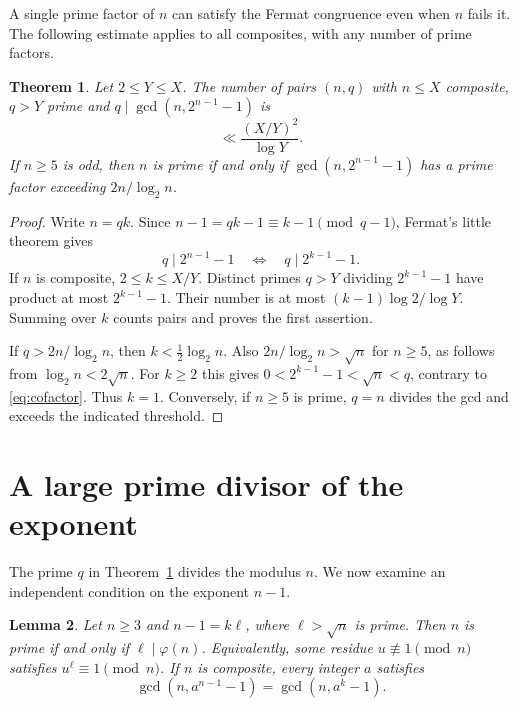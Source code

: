 \documentclass[11pt]{article}
\newtheorem{theorem}{Theorem}[section]
\newtheorem{lemma}[theorem]{Lemma}
\begin{document}
A single prime factor of \(n\) can satisfy the Fermat congruence
even when \(n\) fails it. The following estimate applies to all
composites, with any number of prime factors.

\begin{theorem}\label{thm:common}
Let \(2\le Y\le X\). The number of pairs \((n,q)\) with
\(n\le X\) composite, \(q>Y\) prime and
\(q\mid\gcd(n,2^{n-1}-1)\) is
\[
                        \ll \frac{(X/Y)^2}{\log Y}.
\]
If \(n\ge5\) is odd, then \(n\) is prime if and only if
\(\gcd(n,2^{n-1}-1)\) has a prime factor exceeding
\(2n/\log_2 n\).
\end{theorem}

\begin{proof}
Write \(n=qk\). Since \(n-1=qk-1\equiv k-1\pmod{q-1}\),
Fermat's little theorem gives
\begin{equation}\label{eq:cofactor}
             q\mid 2^{n-1}-1\quad\Longleftrightarrow\quad
             q\mid 2^{k-1}-1.
\end{equation}
If \(n\) is composite, \(2\le k\le X/Y\). Distinct primes
\(q>Y\) dividing \(2^{k-1}-1\) have product at most \(2^{k-1}-1\).
Their number is at most \((k-1)\log 2/\log Y\). Summing over
\(k\) counts pairs and proves the first assertion.

If \(q>2n/\log_2 n\), then \(k<\tfrac12\log_2 n\).
Also \(2n/\log_2 n>\sqrt n\) for \(n\ge5\), as follows
from \(\log_2 n<2\sqrt n\).
For \(k\ge2\) this gives \(0<2^{k-1}-1<\sqrt n<q\), contrary
to \eqref{eq:cofactor}. Thus \(k=1\). Conversely, if \(n\ge5\)
is prime, \(q=n\) divides the gcd and exceeds the indicated
threshold.
\end{proof}

\section{A large prime divisor of the exponent}

The prime \(q\) in Theorem~\ref{thm:common} divides the modulus
\(n\). We now examine an independent condition on the exponent
\(n-1\).

\begin{lemma}\label{lem:exponent}
Let \(n\ge3\) and \(n-1=k\ell\), where \(\ell>\sqrt n\) is
prime. Then \(n\) is prime if and only if \(\ell\mid\varphi(n)\).
Equivalently, some residue \(u\not\equiv1\pmod n\) satisfies
\(u^\ell\equiv1\pmod n\). If \(n\) is composite, every integer
\(a\) satisfies
\[
    \gcd(n,a^{n-1}-1)=\gcd(n,a^k-1).
\]
\end{lemma}
\end{document}
